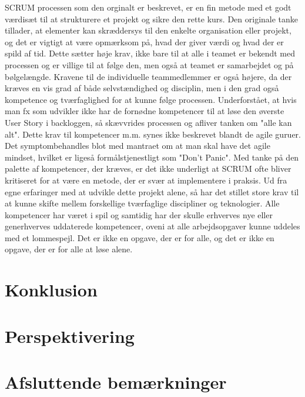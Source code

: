SCRUM processen som den orginalt er beskrevet, er en fin metode med et godt værdisæt til at strukturere et projekt og sikre den rette kurs.
Den originale tanke tillader, at elementer kan skræddersys til den enkelte organisation eller projekt, og det er vigtigt at være opmærksom på, hvad der giver værdi og hvad der er spild af tid.
Dette sætter høje krav, ikke bare til at alle i teamet er bekendt med processen og er villige til at følge den, men også at teamet er samarbejdet og på bølgelængde.
Kravene til de individuelle teammedlemmer er også højere, da der kræves en vis grad af både selvstændighed og disciplin, men i den grad også kompetence og tværfaglighed for at kunne følge processen.
Underforstået, at hvis man fx som udvikler ikke har de fornødne kompetencer til at løse den øverste User Story i backloggen, så skævvrides processen og afliver tanken om "alle kan alt". 
Dette krav til kompetencer m.m. synes ikke beskrevet blandt de agile guruer. Det symptombehandles blot med mantraet om at man skal have det agile mindset, hvilket er ligeså formålstjenestligt som "Don't Panic".
Med tanke på den palette af kompetencer, der kræves, er det ikke underligt at SCRUM ofte bliver kritiseret for at være en metode, der er svær at implementere i praksis.
Ud fra egne erfaringer med at udvikle dette projekt alene, så har det stillet store krav til at kunne skifte mellem forskellige tværfaglige discipliner og teknologier. 
Alle kompetencer har været i spil og samtidig har der skulle erhverves nye eller generhverves uddaterede kompetencer, oveni at alle arbejdsopgaver kunne uddeles med et lommespejl.
Det er ikke en opgave, der er for alle, og det er ikke en opgave, der er for alle at løse alene.

\section{Konklusion}
\label{sec:conclusion_conclusion}

\section{Perspektivering}
\label{sec:conclusion_perspective}

\section{Afsluttende bemærkninger}
\label{sec:conclusion_remarks}

